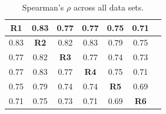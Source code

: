 \documentclass[phd,tocprelim]{cornell}
\begin{document}
\begin{table}
  \begin{tabular}{|c|*{6}{c|}}
    \toprule
    \textbf{R1} & 0.83 & 0.77 & 0.77 & 0.75 & 0.71 \\ \midrule
    0.83 & \textbf{R2} & 0.82 & 0.83 & 0.79 & 0.75 \\ \midrule
    0.77 & 0.82 & \textbf{R3} & 0.77 & 0.74 & 0.73 \\ \midrule
    0.77 & 0.83 & 0.77 & \textbf{R4} & 0.75 & 0.71 \\ \midrule
    0.75 & 0.79 & 0.74 & 0.74 & \textbf{R5} & 0.69 \\ \midrule
    0.71 & 0.75 & 0.73 & 0.71 & 0.69 & \textbf{R6} \\ \midrule
  \end{tabular}
  \caption{Spearman's $\rho$ across all data sets.}
\label{tab:correlations}
\end{table}

\end{document}
